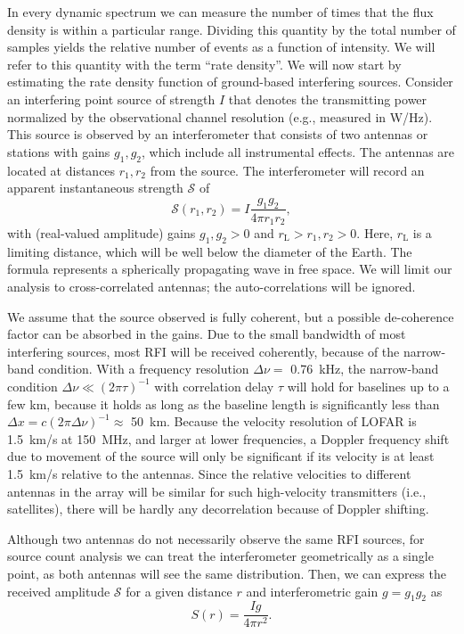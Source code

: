 \documentclass[useAMS,usenatbib]{mn2e}
\begin{document}
In every dynamic spectrum we can measure the number of times that the flux density is within a particular range. Dividing this quantity by the total number of samples yields the relative number of events as a function of intensity. We will refer to this quantity with the term ``rate density''. We will now start by estimating the rate density function of ground-based interfering sources. Consider an interfering point source of strength $I$ that denotes the transmitting power normalized by the observational channel resolution (e.g., measured in W/Hz). This source is observed by an interferometer that consists of two antennas or stations with gains $g_1,g_2$, which include all instrumental effects. The antennas are located at distances $r_1,r_2$ from the source. The interferometer will record an apparent instantaneous strength $\mathcal{S}$ of
\begin{equation}
 \mathcal{S}(r_1, r_2) = I \frac{g_1 g_2}{4\pi r_1 r_2},
\end{equation}
with (real-valued amplitude) gains $g_1,g_2>0$ and $r_\textrm{L} > r_1,r_2 > 0$. Here, $r_\textrm{L}$ is a limiting distance, which will be well below the diameter of the Earth. The formula represents a spherically propagating wave in free space. We will limit our analysis to cross-correlated antennas; the auto-correlations will be ignored.

We assume that the source observed is fully coherent, but a possible de-coherence factor can be absorbed in the gains. Due to the small bandwidth of most interfering sources, most RFI will be received coherently, because of the narrow-band condition. With a frequency resolution $\Delta\nu=$ 0.76~kHz, the narrow-band condition $\Delta \nu \ll (2\pi \tau)^{-1}$ with correlation delay $\tau$ will hold for baselines up to a few km, because it holds as long as the baseline length is significantly less than $\Delta x = c (2 \pi \Delta \nu)^{-1} \approx$ 50~km. Because the velocity resolution of LOFAR is 1.5~km/s at 150~MHz, and larger at lower frequencies, a Doppler frequency shift due to movement of the source will only be significant if its velocity is at least 1.5~km/s relative to the antennas. Since the relative velocities to different antennas in the array will be similar for such high-velocity transmitters (i.e., satellites), there will be hardly any decorrelation because of Doppler shifting.

Although two antennas do not necessarily observe the same RFI sources, for source count analysis we can treat the interferometer geometrically as a single point, as both antennas will see the same distribution. Then, we can express the received amplitude $\mathcal{S}$ for a given distance $r$ and interferometric gain $g = g_1 g_2$ as
\begin{equation} \label{eq:amplitude-fall-off-in-free-space}
 S(r) = \frac{Ig}{4\pi r^2}.
\end{equation}
\end{document}
